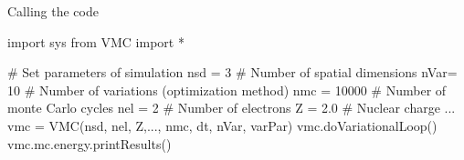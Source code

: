 

\begin{frame}[fragile]{Calling the code}
  \begin{Python}
    import sys
    from VMC import *

    # Set parameters of simulation
    nsd = 3        # Number of spatial dimensions
    nVar= 10       # Number of variations (optimization method)
    nmc = 10000    # Number of monte Carlo cycles
    nel = 2        # Number of electrons
    Z   = 2.0      # Nuclear charge
    ...
    vmc = VMC(nsd, nel, Z,..., nmc, dt, nVar, varPar)
    vmc.doVariationalLoop()
    vmc.mc.energy.printResults()
  \end{Python}
\end{frame}


